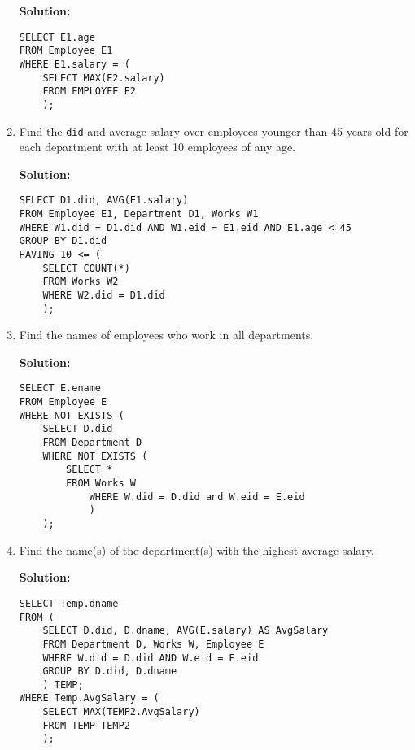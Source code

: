 \begin{enumerate}[label=(\alph*)]
\textbf{Solution:}
\begin{verbatim}
SELECT E1.age
FROM Employee E1
WHERE E1.salary = (
	SELECT MAX(E2.salary)
	FROM EMPLOYEE E2
	);
\end{verbatim}

\item Find the \texttt{did} and average salary over employees younger than 45 years old for each department with at least 10 employees of any age.

\textbf{Solution:}
\begin{verbatim}
SELECT D1.did, AVG(E1.salary)
FROM Employee E1, Department D1, Works W1 
WHERE W1.did = D1.did AND W1.eid = E1.eid AND E1.age < 45
GROUP BY D1.did
HAVING 10 <= (
	SELECT COUNT(*)
	FROM Works W2
	WHERE W2.did = D1.did
	);
\end{verbatim}

\item Find the names of employees who work in all departments.

\textbf{Solution:}
\begin{verbatim}
SELECT E.ename
FROM Employee E
WHERE NOT EXISTS (
	SELECT D.did
	FROM Department D
	WHERE NOT EXISTS (
		SELECT *
		FROM Works W
			WHERE W.did = D.did and W.eid = E.eid
			)
	);
\end{verbatim}

\item Find the name(s) of the department(s) with the highest average salary.

\textbf{Solution:}
\begin{verbatim}
SELECT Temp.dname
FROM (
	SELECT D.did, D.dname, AVG(E.salary) AS AvgSalary
	FROM Department D, Works W, Employee E
	WHERE W.did = D.did AND W.eid = E.eid
	GROUP BY D.did, D.dname
	) TEMP;
WHERE Temp.AvgSalary = (
	SELECT MAX(TEMP2.AvgSalary)
	FROM TEMP TEMP2
	);
\end{verbatim}
\end{enumerate}
